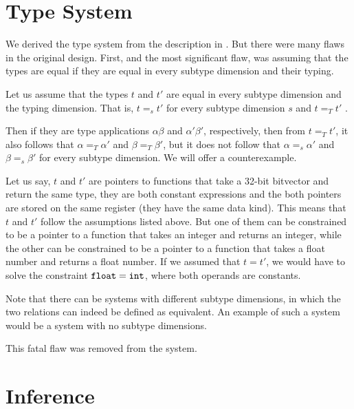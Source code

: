 \section{Type System}

We derived the type system from the description in . But there were many flaws in the original design. First, and the most significant flaw, was assuming that the types are equal if they are equal in every subtype dimension and their typing.

\begin{ex}
    Let us assume that the types $t$ and $t'$ are equal in every subtype dimension and the typing dimension. That is, $t =_s t'$ for every subtype dimension $s$ and $t =_T t'$ .

    Then if they are type applications $\alpha \beta$ and $\alpha' \beta'$, respectively, then from $t =_T t'$, it also follows that $\alpha =_T \alpha'$ and $\beta =_T \beta'$, but it does not follow that $\alpha =_s \alpha'$ and $\beta =_s \beta'$ for every subtype dimension. We will offer a counterexample.

    Let us say, $t$ and $t'$ are pointers to functions that take a 32-bit bitvector and return the same type, they are both constant expressions and the both pointers are stored on the same register (they have the same data kind). This means that $t$ and $t'$ follow the assumptions listed above. But one of them can be constrained to be a pointer to a function that takes an integer and returns an integer, while the other can be constrained to be a pointer to a function that takes a float number and returns a float number. If we assumed that $t = t'$, we would have to solve the constraint $\mathtt{float} = \mathtt{int}$, where both operands are constants.

    Note that there can be systems with different subtype dimensions, in which the two relations can indeed be defined as equivalent. An example of such a system would be a system with no subtype dimensions.
\end{ex}

This fatal flaw was removed from the system.

\section{Inference}



